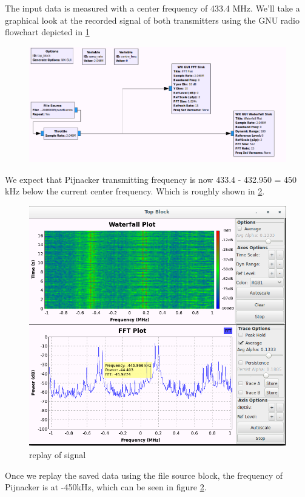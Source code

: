 The input data is measured with a center frequency of 433.4 MHz. We'll take a graphical look at the recorded signal of both transmitters using the GNU radio flowchart depicted in \ref{fig:flowchart_play_from_file_grc}
\begin{figure}[h]
\centering
\includegraphics[width=0.7\linewidth]{figures/flowchart_play_from_file_grc}
\caption[gnu radio flowchart used to replay the captured data]{}

\label{fig:flowchart_play_from_file_grc}
\end{figure}

We expect that Pijnacker transmitting frequency is now 433.4 - 432.950 = 450 kHz below the current center frequency. Which is roughly shown in \ref{fig:gnuradio_waterfall_catpure_replay}. 

\begin{figure}[h]
\centering
\includegraphics[width=0.7\linewidth]{figures/gnuradio_waterfall_catpure_replay}
\caption{replay of signal}
\label{fig:gnuradio_waterfall_catpure_replay}
\end{figure}
 
Once we replay the saved data using the file source block, the frequency of Pijnacker is at -450kHz, which can be seen in figure \ref{fig:gnuradio_waterfall_catpure_replay}. 

